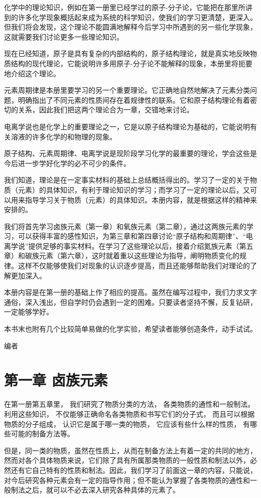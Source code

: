 化学中的理论知识，例如在第一册里已经学过的原子-分子论，它能把在那里所讲到的许多化学现象概括起来成为系统的科学知识，使我们的学习更清楚，更深入。但我们将会发现，这个理论不能圆满地解释今后学习中所遇到的另一些化学现象，这就需要我们讨论更多一些理论知识。

现在已经知道，原子是具有复杂的内部结构的，原子结构理论，就是真实地反映物质结构的现代理论，它能说明许多用原子-分子论不能解释的现象，本册里将扼要地介绍这个理论。

元素周期律是本册里要学习的另一个重要理论。它正确地自然地解决了元素分类问题，明确指出了不同元素的性质间存在着规律性的联系。它和原子结构理论有着密切的关系，因此我们把这两个理论合为一章，交错地来讨论。

电离学说也是化学上的重要理论之一，它是以原子结构理论为基础的，它能说明有关溶液的许多化学的和物理的现象。

原子结构、元素周期律、电离学说是现阶段学习化学的最重要的理论，学会这些是今后进一步学好化学的必不可少的条件。

我们知道，理论是在一定事实材料的基础上总结概括得出的。学习了一定的关于物质（元素）的具体知识，有利于理论知识的学习；而学习了一定的理论以后，又可以用来指导学习关于物质（元素）的具体知识。本册内容，就是根据这样的精神来安排的。

我们将首先学习卤族元素（第一章）和氧族元素（第二章），通过这两族元素的学习，可以获得丰富的感性知识，为第三章和第四章讨论``原子结构和周期律''、``电离学说''提供足够的事实材料。在学习了这些理论以后，接着介绍氮族元素（第五章）和碳族元素（第六章），这时就着重以这些理论为指导，阐明物质变化的规律。这样不仅能够使我们对现象的认识逐步提高，而且还能够帮助我们对理论的了解更加深入。

本册内容是在第一册的基础上作了相应的提高。虽然在编写过程中，我们力求文字通俗，深入浅出，但自学时仍会遇到一定的困难。只要读者坚持不懈，反复钻研，一定能够学好。

本书末也附有几个比较简单易做的化学实验，希望读者能够创造条件，动手试试。

编者

\chapter{第一章 卤族元素}

在第一册第五章里， 我们研究了物质分类的方法，
各类物质的通性和一般制法。利用这些知识，
不仅能够正确命名各类物质和书写它们的分子式，
而且可以根据物质的分子组成， 认识它是属于哪一类的物质，
它应该有些什么样的性质， 有哪些可能的制备方法等。

但是，同一类的物质，虽然在性质上，从而在制备方法上有着一定的共同的地方，然而对各个具体物质来说，它们除了具有所属那类物质的一般性质和制法以外，必然还有它自己特有的性质和制法。因此，我们学习了前面这一章的内容，只能说，对今后研究各种元素会有一定的指导作用；但不能认为掌握了各类物质的通性和一般制法之后，就可以不必去深入研究各种具体的元素了。

